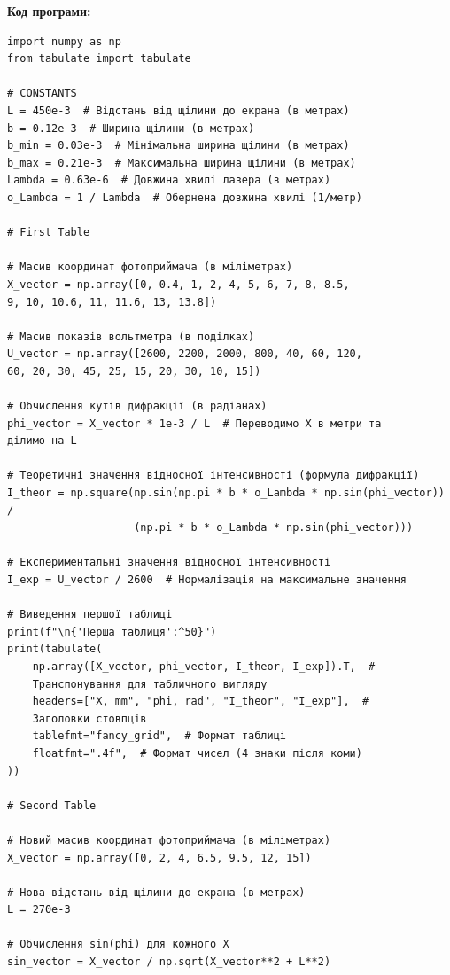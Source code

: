 \documentclass[12pt,a4paper]{article}
\begin{document}
    \vspace{3em}

    \textbf{\large Код програми:}

    \vspace{1em}

    \small{ 

\begin{verbatim}
import numpy as np
from tabulate import tabulate

# CONSTANTS
L = 450e-3  # Відстань від щілини до екрана (в метрах)
b = 0.12e-3  # Ширина щілини (в метрах)
b_min = 0.03e-3  # Мінімальна ширина щілини (в метрах)
b_max = 0.21e-3  # Максимальна ширина щілини (в метрах)
Lambda = 0.63e-6  # Довжина хвилі лазера (в метрах)
o_Lambda = 1 / Lambda  # Обернена довжина хвилі (1/метр)

# First Table

# Масив координат фотоприймача (в міліметрах)
X_vector = np.array([0, 0.4, 1, 2, 4, 5, 6, 7, 8, 8.5,
9, 10, 10.6, 11, 11.6, 13, 13.8])

# Масив показів вольтметра (в поділках)
U_vector = np.array([2600, 2200, 2000, 800, 40, 60, 120,
60, 20, 30, 45, 25, 15, 20, 30, 10, 15])

# Обчислення кутів дифракції (в радіанах)
phi_vector = X_vector * 1e-3 / L  # Переводимо X в метри та
ділимо на L

# Теоретичні значення відносної інтенсивності (формула дифракції)
I_theor = np.square(np.sin(np.pi * b * o_Lambda * np.sin(phi_vector)) / 
                    (np.pi * b * o_Lambda * np.sin(phi_vector)))

# Експериментальні значення відносної інтенсивності
I_exp = U_vector / 2600  # Нормалізація на максимальне значення

# Виведення першої таблиці
print(f"\n{'Перша таблиця':^50}")
print(tabulate(
    np.array([X_vector, phi_vector, I_theor, I_exp]).T,  #
    Транспонування для табличного вигляду
    headers=["X, mm", "phi, rad", "I_theor", "I_exp"],  #
    Заголовки стовпців
    tablefmt="fancy_grid",  # Формат таблиці
    floatfmt=".4f",  # Формат чисел (4 знаки після коми)
))

# Second Table

# Новий масив координат фотоприймача (в міліметрах)
X_vector = np.array([0, 2, 4, 6.5, 9.5, 12, 15])

# Нова відстань від щілини до екрана (в метрах)
L = 270e-3

# Обчислення sin(phi) для кожного X
sin_vector = X_vector / np.sqrt(X_vector**2 + L**2)


\end{verbatim}}
\end{document}
